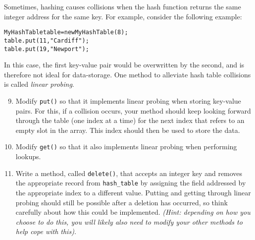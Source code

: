 \documentclass[11pt,a4paper]{report}
\begin{document}
\noindent Sometimes, hashing causes collisions when the hash function returns the same integer address for the same key. For example, consider the following example:
\begin{alltt}
MyHashTable table = new MyHashTable(8);
table.put(11, "Cardiff");
table.put(19, "Newport");
\end{alltt}
In this case, the first key-value pair would be overwritten by the second, and is therefore not ideal for data-storage. One method to alleviate hash table collisions is called \textit{linear probing}.

\begin{enumerate}
    \setcounter{enumi}{8}
    \item Modify \texttt{put()} so that it implements linear probing when storing key-value pairs. For this, if a collision occurs, your method should keep looking forward through the table (one index at a time) for the next index that refers to an empty slot in the array. This index should then be used to store the data.
    \item Modify \texttt{get()} so that it also implements linear probing when performing lookups. 
    \item Write a method, called \texttt{delete()}, that accepts an integer key and removes the appropriate record from \texttt{hash\_table} by assigning the field addressed by the appropriate index to a different value. Putting and getting through linear probing should still be possible after a deletion has occurred, so think carefully about how this could be implemented. \textit{(Hint: depending on how you choose to do this, you will likely also need to modify your other methods to help cope with this).}
     
\end{enumerate}
\end{document}
